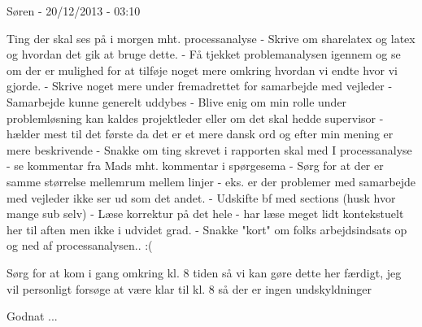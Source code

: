 Søren - 20/12/2013 - 03:10

Ting der skal ses på i morgen mht. processanalyse
 - Skrive om sharelatex og latex og hvordan det gik at bruge dette. 
 - Få tjekket problemanalysen igennem og se om der er mulighed for at tilføje noget mere omkring hvordan vi endte hvor vi gjorde. 
 - Skrive noget mere under fremadrettet for samarbejde med vejleder 
 - Samarbejde kunne generelt uddybes 
 - Blive enig om min rolle under problemløsning kan kaldes projektleder eller om det skal hedde supervisor - hælder mest til det første da det er et mere dansk ord og efter min mening er mere beskrivende 
 - Snakke om ting skrevet i rapporten skal med I processanalyse - se kommentar fra Mads mht. kommentar i spørgesema
 - Sørg for at der er samme størrelse mellemrum mellem linjer - eks. er der problemer med samarbejde med vejleder ikke ser ud som det andet. 
 - Udskifte bf med sections (husk hvor mange sub selv) 
 - Læse korrektur på det hele - har læse meget lidt kontekstuelt her til aften men ikke i udvidet grad.
 - Snakke "kort" om folks arbejdsindsats op og ned af processanalysen.. :(

Sørg for at kom i gang omkring kl. 8 tiden så vi kan gøre dette her færdigt, jeg vil personligt forsøge at være klar til kl. 8 så der er ingen undskyldninger

Godnat ...